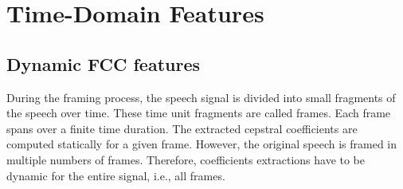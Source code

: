 
\section{Time-Domain Features}
\subsection{Dynamic FCC features}
During the framing process, the speech signal 
is divided into small fragments of the speech over time. 
These time unit fragments are called frames.
Each frame spans over a finite time duration.
The extracted cepstral coefficients are computed statically
for a given frame. However, the original speech
is framed in multiple numbers of frames. 
Therefore, coefficients extractions
have to be dynamic for the entire signal, i.e., all frames.

